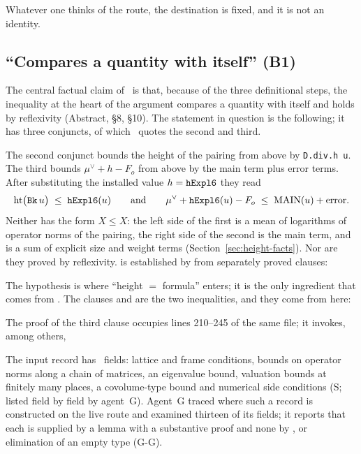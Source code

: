 Whatever one thinks of the route, the destination is fixed, and it is not an identity.

\subsection{``Compares a quantity with itself'' (B1)}
\label{sec:squeeze}

The central factual claim of \N\ is that, because of the three definitional steps, the inequality at the heart of the argument compares a quantity with itself and holds by reflexivity (Abstract, \S8, \S10).
The statement in question is the following; it has three conjuncts, of which \N\ quotes the second and third.


The second conjunct bounds the height of the pairing  from above by \texttt{D.div.h u}. The third bounds $\mu^\vee + h - F_o$ from above by the main term plus error terms.
After substituting the installed value $h = \text{\texttt{hExpl6}}$ they read
\[
\mathrm{ht}\bigl(\text{\texttt{Bk}}\,u\bigr) \;\le\; \text{\texttt{hExpl6}}(u)
\qquad\text{and}\qquad
\mu^\vee + \text{\texttt{hExpl6}}(u) - F_o \;\le\; \mathrm{MAIN}(u) + \text{error}.
\]
Neither has the form $X \le X$: the left side of the first is a mean of logarithms of operator norms of the pairing, the right side of the second is the main term, and  is a sum of explicit size and weight terms (Section~\ref{sec:height-facts}).
Nor are they proved by reflexivity.  is established by  from separately proved clauses:


The hypothesis  is where ``height $=$ formula'' enters; it is the only ingredient that comes from . The clauses  and  are the two inequalities, and they come from here:


The proof of the third clause occupies lines 210--245 of the same file; it invokes, among others,


The input record  has \NdivInputs\ fields: lattice and frame conditions, bounds on operator norms along a chain of matrices, an eigenvalue bound, valuation bounds at finitely many places, a covolume-type bound and numerical side conditions (\textsf{S}; listed field by field by agent~G).
Agent~G traced where such a record is constructed on the live route and examined thirteen of its fields; it reports that each is supplied by a lemma with a substantive proof and none by ,  or elimination of an empty type (\textsf{G-G}).

